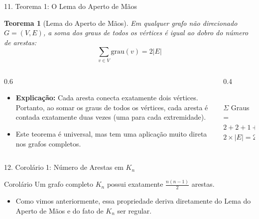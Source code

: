 \documentclass[9pt]{beamer}
\newtheorem{teorema}{Teorema}\usepackage{mathtools}
\begin{document}
    \begin{frame}{11. Teorema 1: O Lema do Aperto de Mãos}
        \begin{teorema}[Lema do Aperto de Mãos]
            Em qualquer grafo não direcionado $G = (V,E)$, a soma dos graus de todos os vértices é igual ao dobro do número de arestas:
            \[ \sum_{v \in V} \text{grau}(v) = 2|E| \]
        \end{teorema}
        \vspace{0.3cm}
        \begin{columns}
            \begin{column}{0.6\textwidth}
                \begin{itemize}
                    \item \textbf{Explicação:} Cada aresta conecta exatamente dois vértices. Portanto, ao somar os graus de todos os vértices, cada aresta é contada exatamente duas vezes (uma para cada extremidade).
                    \item Este teorema é universal, mas tem uma aplicação muito direta nos grafos completos.
                \end{itemize}
            \end{column}
            \begin{column}{0.4\textwidth}
                \centering
                \\
                \tiny $\Sigma$ Graus = $2+2+1+1 = 6$\\$2 \times |E| = 2 \times 3 = 6$
            \end{column}
        \end{columns}
    \end{frame}

    \begin{frame}{12. Corolário 1: Número de Arestas em $K_n$}
        \begin{block}{Corolário}
            Um grafo completo $K_n$ possui exatamente $\frac{n(n-1)}{2}$ arestas.
        \end{block}
        \vspace{0.3cm}
        \begin{itemize}
            \item Como vimos anteriormente, essa propriedade deriva diretamente do Lema do Aperto de Mãos e do fato de $K_n$ ser regular.
        \end{itemize}
    \end{frame}
\end{document}
